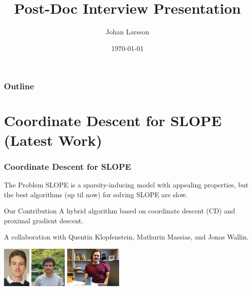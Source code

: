 \documentclass[10pt,aspectratio=169]{beamer}
\title{Post-Doc Interview Presentation}
\author{Johan Larsson}
\institute{Department of Statistics, Lund University}
\date{\today}
\begin{document}
\maketitle

\begin{frame}[c]
  \frametitle{Outline}
  \tableofcontents
\end{frame}

\section{Coordinate Descent for SLOPE (Latest Work)}

\begin{frame}[c]
  \frametitle{Coordinate Descent for SLOPE}

  \begin{alertblock}{The Problem}
    SLOPE is a sparsity-inducing model with appealing properties, but the
    best algorithms (up til now) for solving SLOPE are slow.
  \end{alertblock}

  \begin{exampleblock}{Our Contribution}
    A hybrid algorithm based on coordinate descent (CD) and
    proximal gradient descent.
  \end{exampleblock}

  \pause

  A collaboration with Quentin Klopfenstein, Mathurin Massias, and Jonas Wallin.

  \begin{center}
    \hfill
    \includegraphics[height=2cm]{figures/quentin.png}
    \hfill
    \includegraphics[height=2cm]{figures/mathurin.jpg}
    \hfill
    \includegraphics[height=2cm]{figures/jonas.jpg}
    \hfill
    \null
  \end{center}
\end{frame}
\end{document}
